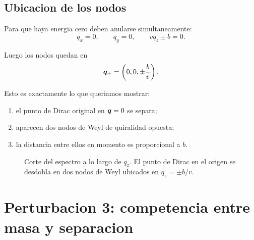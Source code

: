 \subsection{Ubicacion de los nodos}

Para que haya energia cero deben anularse simultaneamente:
\begin{equation}
q_x=0,\qquad q_y=0,\qquad v q_z \pm b = 0.
\end{equation}

Luego los nodos quedan en
\begin{equation}
\bm{q}_\pm = \left(0,0,\pm \frac{b}{v}\right).
\label{c13:eq:weyl-nodes-position}
\end{equation}

Esto es exactamente lo que queriamos mostrar:

\begin{enumerate}[leftmargin=*]
  \item el punto de Dirac original en \(\bm{q}=0\) se separa;
  \item aparecen dos nodos de Weyl de quiralidad opuesta;
  \item la distancia entre ellos en momento es proporcional a \(b\).
\end{enumerate}

\begin{figure}[ht]
\centering
{}
\caption{Corte del espectro a lo largo de \(q_z\). El punto de Dirac en el origen se desdobla en dos nodos de Weyl ubicados en \(q_z=\pm b/v\).}
\label{c13:fig:split-qz}
\end{figure}

\section{Perturbacion 3: competencia entre masa y separacion}


